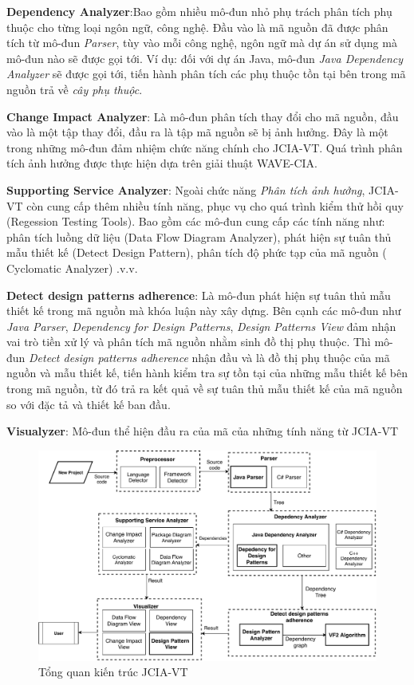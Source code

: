 \documentclass[12pt]{report}
\begin{document}
\noindent \textbf{Dependency Analyzer}:Bao gồm nhiều mô-đun nhỏ phụ trách phân tích phụ thuộc cho từng loại ngôn ngữ, công nghệ. Đầu vào là mã nguồn đã được phân tích từ mô-đun \textit{Parser}, tùy vào mỗi công nghệ, ngôn ngữ mà dự án sử dụng mà mô-đun nào sẽ được gọi tới. Ví dụ: đối với dự án Java, mô-đun \textit{Java Dependency Analyzer} sẽ được gọi tới, tiến hành phân tích các phụ thuộc tồn tại bên trong mã nguồn trả về \textit{cây phụ thuộc}.

\noindent \textbf{Change Impact Analyzer}: Là mô-đun phân tích thay đổi cho mã nguồn, đầu vào là một tập thay đổi, đầu ra là tập mã nguồn sẽ bị ảnh hưởng. Đây là một trong những mô-đun đảm nhiệm chức năng chính cho JCIA-VT. Quá trình phân tích ảnh hưởng được thực hiện dựa trên giải thuật WAVE-CIA.

\noindent \textbf{Supporting Service Analyzer}: Ngoài chức năng \textit{Phân tích ảnh hưởng}, JCIA-VT còn cung cấp thêm nhiều tính năng, phục vụ cho quá trình kiểm thử hồi quy (Regession Testing Tools). Bao gồm các mô-đun cung cấp các tính năng như: phân tích luồng dữ liệu (Data Flow Diagram Analyzer), phát hiện sự tuân thủ mẫu thiết kế (Detect Design Pattern), phân tích độ phức tạp của mã nguồn ( Cyclomatic Analyzer) .v.v.

\noindent \textbf{Detect design patterns adherence}: Là mô-đun phát hiện sự tuân thủ mẫu thiết kế trong mã nguồn mà khóa luận này xây dựng. Bên cạnh các mô-đun như \textit{Java Parser}, \textit{Dependency for Design Patterns}, \textit{Design Patterns View} đảm nhận vai trò tiền xử lý và phân tích mã nguồn nhằm sinh đồ thị phụ thuộc. Thì mô-đun \textit{Detect design patterns adherence} nhận đầu và là đồ thị phụ thuộc của mã nguồn và mẫu thiết kế, tiến hành kiểm tra sự tồn tại của những mẫu thiết kế bên trong mã nguồn, từ đó trả ra kết quả về sự tuân thủ mẫu thiết kế của mã nguồn so với đặc tả và thiết kế ban đầu. 

\noindent \textbf{Visualyzer}: Mô-đun thể hiện đầu ra của mã của những tính năng từ JCIA-VT
\begin{figure}[h]
	\centering
	\includegraphics[scale=0.7]{images/jcia_architexture}
	\caption{Tổng quan kiến trúc JCIA-VT}
	\label{fig:architexture}
\end{figure}
\end{document}
